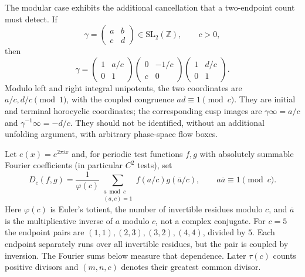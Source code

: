 The modular case exhibits the additional cancellation that a two-endpoint
count must detect.  If
\[
 \gamma=\begin{pmatrix}a&b\\c&d\end{pmatrix}\in\mathrm{SL}_2(\mathbb Z),
 \qquad c>0,
\]
then
\begin{equation}\label{eq:pairbruhat}
 \gamma=
 \begin{pmatrix}1&a/c\\0&1\end{pmatrix}
 \begin{pmatrix}0&-1/c\\c&0\end{pmatrix}
 \begin{pmatrix}1&d/c\\0&1\end{pmatrix}.
\end{equation}
Modulo left and right integral unipotents, the two coordinates are
$a/c,d/c\pmod1$, with the coupled congruence $ad\equiv1\pmod c$.
They are initial and terminal horocyclic coordinates; the corresponding
cusp images are $\gamma\infty=a/c$ and
$\gamma^{-1}\infty=-d/c$.  They should not be identified, without an
additional unfolding argument, with arbitrary phase-space flow boxes.

Let $e(x)=e^{2\pi ix}$ and, for periodic test functions $f,g$ with
absolutely summable Fourier coefficients (in particular $C^2$ tests), set
\[
 D_c(f,g)=\frac1{\varphi(c)}
       \sum_{\substack{a\bmod c\\(a,c)=1}}
           f(a/c)g(\overline a/c),\qquad
 a\overline a\equiv1\pmod c.
\]
Here $\varphi(c)$ is Euler's totient, the number of invertible
residues modulo $c$, and $\overline a$ is the multiplicative
inverse of $a$ modulo $c$, not a complex conjugate.
For $c=5$ the endpoint pairs are
$(1,1),(2,3),(3,2),(4,4)$, divided by $5$.
Each endpoint separately runs over all invertible residues, but
the pair is coupled by inversion. The Fourier sums below measure
that dependence. Later $\tau(c)$ counts positive divisors and
$(m,n,c)$ denotes their greatest common divisor.


